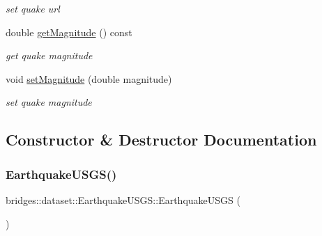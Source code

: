 \begin{DoxyCompactItemize}
\begin{DoxyCompactList}\small\item\em set quake url \end{DoxyCompactList}\item 
double \mbox{\hyperlink{classbridges_1_1dataset_1_1_earthquake_u_s_g_s_aeb1be6b0dece1240da3123db9f9c2d9b}{get\+Magnitude}} () const
\begin{DoxyCompactList}\small\item\em get quake magnitude \end{DoxyCompactList}\item 
void \mbox{\hyperlink{classbridges_1_1dataset_1_1_earthquake_u_s_g_s_ab961fcafd63f3ec0626ff38e2c4c01cd}{set\+Magnitude}} (double magnitude)
\begin{DoxyCompactList}\small\item\em set quake magnitude \end{DoxyCompactList}\end{DoxyCompactItemize}


\subsection{Constructor \& Destructor Documentation}
\mbox{\label{classbridges_1_1dataset_1_1_earthquake_u_s_g_s_a2e89f6ef9b631c6b8315c696cee7fb53}} 
\subsubsection{\texorpdfstring{EarthquakeUSGS()}{EarthquakeUSGS()}\hspace{0.1cm}{\footnotesize\ttfamily [1/3]}}
{\footnotesize\ttfamily bridges\+::dataset\+::\+Earthquake\+U\+S\+G\+S\+::\+Earthquake\+U\+S\+GS (\begin{DoxyParamCaption}{ }\end{DoxyParamCaption})\hspace{0.3cm}{\ttfamily [inline]}}

\mbox{\label{classbridges_1_1dataset_1_1_earthquake_u_s_g_s_a3bb03ca9f4c0a3c8ecbab5a90b1886f8}} 
